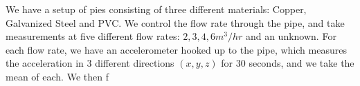 We have a setup of pies consisting of three different materials: Copper, Galvanized Steel and PVC. We control the flow rate through the pipe, and take measurements at five different flow rates: $2, 3, 4, 6 m^3/hr$ and an unknown. For each flow rate, we have an accelerometer hooked up to the pipe, which measures the acceleration in 3 different directions $(x, y, z)$ for 30 seconds, and we take the mean of each. We then f
